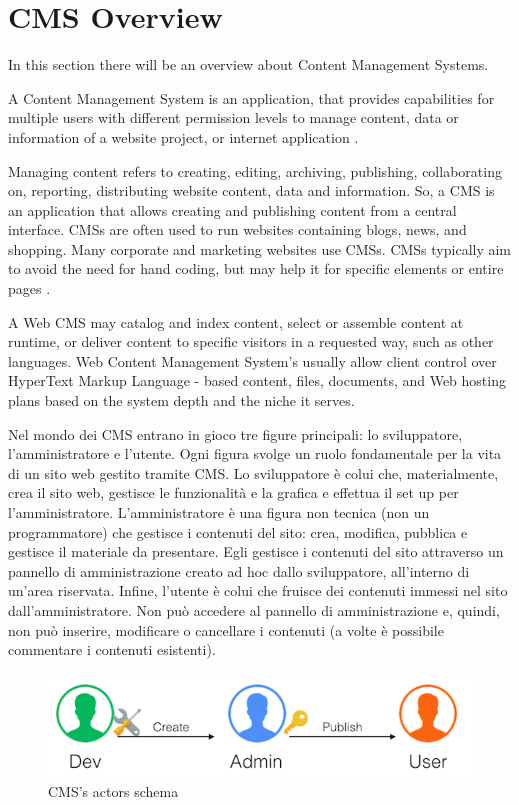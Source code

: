 \section{CMS Overview}
\label{sec:CMS_overview}

In this section there will be an overview about Content Management Systems.

A Content Management System is an application, that provides capabilities for multiple users with different permission levels to manage content, data or information of a website project, or internet application \cite{cms_def}.

Managing content refers to creating, editing, archiving, publishing, collaborating on, reporting, distributing website content, data and information.
So, a CMS is an application that allows creating and publishing content from a central interface. CMSs are often used to run websites containing blogs, news, and shopping. Many corporate and marketing websites use CMSs. CMSs typically aim to avoid the need for hand coding, but may help it for specific elements or entire pages \cite{cms_over}. 

A Web CMS may catalog and index content, select or assemble content at runtime, or deliver content to specific visitors in a requested way, such as other languages. Web Content Management System's usually allow client control over HyperText Markup Language - based content, files, documents, and Web hosting plans based on the system depth and the niche it serves.



Nel mondo dei CMS entrano in gioco tre figure principali: lo sviluppatore, l’amministratore e l’utente. Ogni figura svolge un ruolo fondamentale per la vita di un sito web gestito tramite CMS.
Lo sviluppatore è colui che, materialmente, crea il sito web, gestisce le funzionalità e la grafica e effettua il set up per l’amministratore.
L’amministratore è una figura non tecnica (non un programmatore) che gestisce i contenuti del sito: crea, modifica, pubblica e gestisce il materiale da presentare. Egli gestisce i contenuti del sito attraverso un pannello di amministrazione creato ad hoc dallo sviluppatore, all’interno di un’area riservata.
Infine, l’utente è colui che fruisce dei contenuti immessi nel sito dall’amministratore. Non può accedere al pannello di amministrazione e, quindi, non può inserire, modificare o cancellare i contenuti (a volte è possibile commentare i contenuti esistenti).



\begin {figure}[h]
\graphicspath{{images/chapter_cms/}}
\includegraphics[width=\textwidth]{cms_schema}
\caption{CMS's actors schema}
\end {figure}



